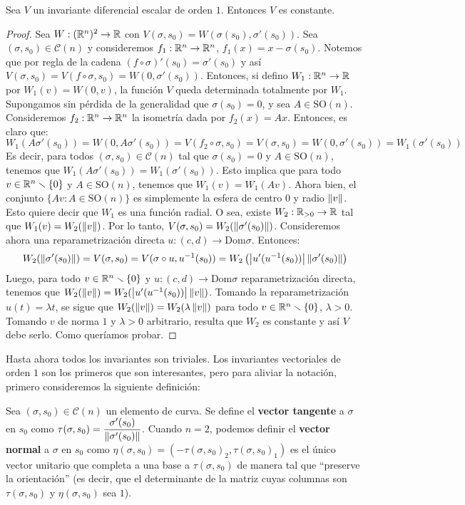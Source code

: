 \begin{prop}
Sea $V$ un invariante diferencial escalar de orden $1$. Entonces $V$ es constante.
\begin{proof}
Sea $W:(\mathbb{R}^n)^2\to\mathbb{R}$ con $V(\sigma,s_0)=W(\sigma(s_0),\sigma'(s_0))$. Sea $(\sigma,s_0)\in\mathscr{C}(n)$ y consideremos $f_1:\mathbb{R}^n\to\mathbb{R}^n$, $f_1(x)=x-\sigma(s_0)$. Notemos que por regla de la cadena $(f\circ\sigma)'(s_0) = \sigma'(s_0)$ y así $V(\sigma,s_0)=V(f\circ\sigma,s_0)=W(0,\sigma'(s_0))$. Entonces, si defino $W_1:\mathbb{R}^n\to\mathbb{R}$ por $W_1(v)=W(0,v)$, la función $V$ queda determinada totalmente por $W_1$.
Supongamos sin pérdida de la generalidad que $\sigma(s_0)=0$, y sea $A\in\mathrm{SO}(n)$. Consideremos $f_2:\mathbb{R}^n\to\mathbb{R}^n$ la isometría dada por $f_2(x)=Ax$. Entonces, es claro que: $$W_1(A\sigma'(s_0)) = W(0,A\sigma'(s_0)) = V(f_2\circ\sigma,s_0) = V(\sigma,s_0)=W(0,\sigma'(s_0))=W_1(\sigma'(s_0))$$
Es decir, para todos $(\sigma,s_0)\in\mathscr{C}(n)$ tal que $\sigma(s_0)=0$ y $A\in\mathrm{SO}(n)$, tenemos que $W_1(A\sigma'(s_0))=W_1(\sigma'(s_0))$. Esto implica que para todo $v\in\mathbb{R}^n\smallsetminus\{0\}$ y $A\in\mathrm{SO}(n)$, tenemos que $W_1(v)=W_1(Av)$. Ahora bien, el conjunto $\{Av:A\in\mathrm{SO}(n)\}$ es simplemente la esfera de centro $0$ y radio $\left\| v \right\|$. Esto quiere decir que $W_1$ es una función radial. O sea, existe $W_2:\mathbb{R}_{>0}\to\mathbb{R}$ tal que $W_1(v)=W_2(\left\| v \right\|)$. Por lo tanto, $V(\sigma,s_0)=W_2(\left\| \sigma'(s_0) \right\|)$. Consideremos ahora una reparametrización directa $u:(c,d)\to\mathrm{Dom}\sigma$. Entonces: $$W_2(\left\| \sigma'(s_0) \right\|) = V(\sigma,s_0)=V(\sigma\circ u,u^{-1}(s_0)) = W_2\left(\left\lvert u'(u^{-1}(s_0)) \right\rvert\left\| \sigma'(s_0) \right\|\right)$$ Luego, para todo $v\in\mathbb{R}^n\smallsetminus\{0\}$ y $u:(c,d)\to\mathrm{Dom}\sigma$ reparametrización directa, tenemos que $W_2(\left\| v \right\|)=W_2(\left\lvert u'(u^{-1}(s_0)) \right\rvert\left\| v \right\|)$. Tomando la reparametrización $u(t)=\lambda t$, se sigue que $W_2(\left\| v \right\|)=W_2(\lambda\left\| v \right\|)$ para todo $v\in\mathbb{R}^n\smallsetminus\{0\}$, $\lambda>0$. Tomando $v$ de norma $1$ y $\lambda>0$ arbitrario, resulta que $W_2$ es constante y así $V$ debe serlo. Como queríamos probar.
\end{proof}
\end{prop}

Hasta ahora todos los invariantes son triviales. Los invariantes vectoriales de orden $1$ son los primeros que son interesantes, pero para aliviar la notación, primero consideremos la siguiente definición:

\begin{defn}
Sea $(\sigma,s_0)\in\mathscr{C}(n)$ un elemento de curva. Se define el \textbf{vector tangente} a $\sigma$ en $s_0$ como $\tau(\sigma,s_0)=\dfrac{\sigma'(s_0)}{\left\| \sigma'(s_0) \right\|}$. Cuando $n=2$, podemos definir el \textbf{vector normal} a $\sigma$ en $s_0$ como $\eta(\sigma,s_0) = (-\tau(\sigma,s_0)_2, \tau(\sigma,s_0)_1)$ es el único vector unitario que completa a una base a $\tau(\sigma,s_0)$ de manera tal que "`preserve la orientación"' (es decir, que el determinante de la matriz cuyas columnas son $\tau(\sigma,s_0)$ y $\eta(\sigma,s_0)$ sea $1$).
\end{defn}

